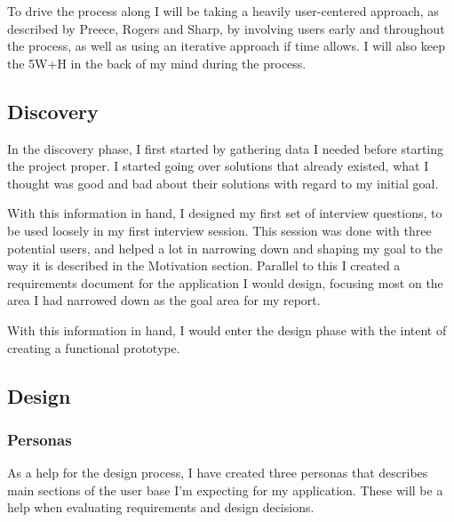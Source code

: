 \documentclass[]{report}
\begin{document}
To drive the process along I will be taking a heavily user-centered approach, as
described by Preece, Rogers and Sharp\cite{preece07:_inter_desig}, by involving
users early and throughout the process, as well as using an iterative approach
if time allows. I will also keep the 5W+H\cite{heim08:_reson_inter} in the back
of my mind during the process.

\subsection{Discovery}

In the discovery phase, I first started by gathering data I needed before
starting the project proper. I started going over solutions that already
existed, what I thought was good and bad about their solutions with regard to my
initial goal.

With this information in hand, I designed my first set of interview questions,
to be used loosely in my first interview session. This session was done with
three potential users, and helped a lot in narrowing down and shaping my goal
to the way it is described in the Motivation section. Parallel to this I created
a requirements document for the application I would design, focusing most on the
area I had narrowed down as the goal area for my report.

With this information in hand, I would enter the design phase with the intent of
creating a functional prototype.

\subsection{Design}

\subsubsection{Personas}

As a help for the design process, I have created three personas that describes
main sections of the user base I'm expecting for my application. These will be a
help when evaluating requirements and design decisions.
\end{document}
